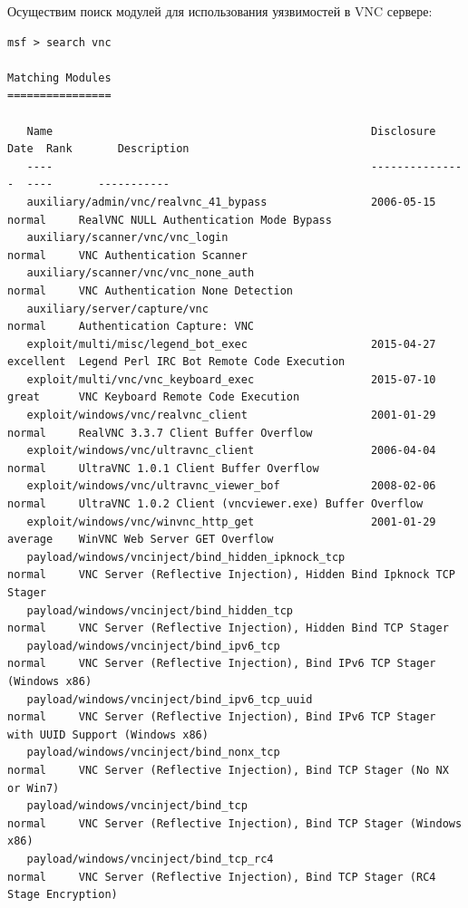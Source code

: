 \documentclass[10pt,a4paper]{report}
\begin{document}
		Осуществим поиск модулей для использования уязвимостей в VNC сервере:
		\begin{lstlisting}
msf > search vnc

Matching Modules
================

   Name                                                 Disclosure Date  Rank       Description
   ----                                                 ---------------  ----       -----------
   auxiliary/admin/vnc/realvnc_41_bypass                2006-05-15       normal     RealVNC NULL Authentication Mode Bypass
   auxiliary/scanner/vnc/vnc_login                                       normal     VNC Authentication Scanner
   auxiliary/scanner/vnc/vnc_none_auth                                   normal     VNC Authentication None Detection
   auxiliary/server/capture/vnc                                          normal     Authentication Capture: VNC
   exploit/multi/misc/legend_bot_exec                   2015-04-27       excellent  Legend Perl IRC Bot Remote Code Execution
   exploit/multi/vnc/vnc_keyboard_exec                  2015-07-10       great      VNC Keyboard Remote Code Execution
   exploit/windows/vnc/realvnc_client                   2001-01-29       normal     RealVNC 3.3.7 Client Buffer Overflow
   exploit/windows/vnc/ultravnc_client                  2006-04-04       normal     UltraVNC 1.0.1 Client Buffer Overflow
   exploit/windows/vnc/ultravnc_viewer_bof              2008-02-06       normal     UltraVNC 1.0.2 Client (vncviewer.exe) Buffer Overflow
   exploit/windows/vnc/winvnc_http_get                  2001-01-29       average    WinVNC Web Server GET Overflow
   payload/windows/vncinject/bind_hidden_ipknock_tcp                     normal     VNC Server (Reflective Injection), Hidden Bind Ipknock TCP Stager
   payload/windows/vncinject/bind_hidden_tcp                             normal     VNC Server (Reflective Injection), Hidden Bind TCP Stager
   payload/windows/vncinject/bind_ipv6_tcp                               normal     VNC Server (Reflective Injection), Bind IPv6 TCP Stager (Windows x86)
   payload/windows/vncinject/bind_ipv6_tcp_uuid                          normal     VNC Server (Reflective Injection), Bind IPv6 TCP Stager with UUID Support (Windows x86)
   payload/windows/vncinject/bind_nonx_tcp                               normal     VNC Server (Reflective Injection), Bind TCP Stager (No NX or Win7)
   payload/windows/vncinject/bind_tcp                                    normal     VNC Server (Reflective Injection), Bind TCP Stager (Windows x86)
   payload/windows/vncinject/bind_tcp_rc4                                normal     VNC Server (Reflective Injection), Bind TCP Stager (RC4 Stage Encryption)

\end{lstlisting}
\end{document}
